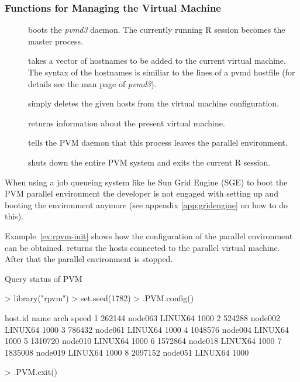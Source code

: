 \subsubsection{Functions for Managing the Virtual Machine}
\begin{description}
\item[] boots the \textit{pvmd3} daemon. The
  currently running R session becomes the master process. 
\item[] takes a vector of hostnames to
  be added to the current virtual machine. The syntax of the
  hostnames is similiar to the lines of a pvmd hostfile (for details
  see the man page of \textit{pvmd3}). 
\item[] simply deletes the given hosts from
  the virtual machine configuration.
\item[] returns information about the present
  virtual machine.
\item[] tells the PVM daemon that this process
  leaves the parallel environment.
\item[] shuts down the entire PVM system and exits
  the current R session.
\end{description}
  
When using a job queueing system like he Sun Grid Engine (SGE) to boot
the PVM parallel environment the developer is not engaged with
setting up and booting the environment anymore (see
appendix \ref{app:gridengine} on how to do this).

Example~\ref{ex:rpvm-init} shows how the configuration of the parallel
environment can be obtained.  returns the hosts
connected to 
the parallel virtual machine. After that the
parallel environment is stopped. 

\begin{Example} Query status of PVM 
\label{ex:rpvm-init}
\begin{Schunk}
\begin{Sinput}
> library("rpvm")
> set.seed(1782)
> .PVM.config()
\end{Sinput}
\begin{Soutput}
  host.id    name    arch speed
1  262144 node063 LINUX64  1000
2  524288 node002 LINUX64  1000
3  786432 node061 LINUX64  1000
4 1048576 node004 LINUX64  1000
5 1310720 node010 LINUX64  1000
6 1572864 node018 LINUX64  1000
7 1835008 node019 LINUX64  1000
8 2097152 node051 LINUX64  1000
\end{Soutput}
\begin{Sinput}
> .PVM.exit()
\end{Sinput}
\end{Schunk}
\end{Example}


